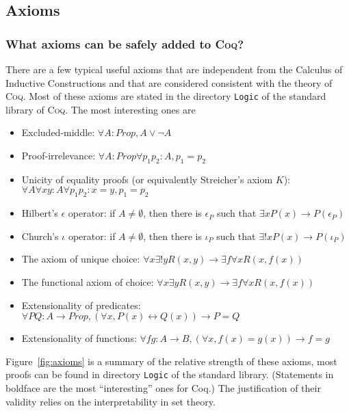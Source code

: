 \documentclass[a4paper,pdftex]{article}
\def\Question#1{\stepcounter{question}\subsubsection{#1}}
\def\Coq{\textsc{Coq}}
\begin{document}
\subsection{Axioms}

\Question{What axioms can be safely added to {\Coq}?}

There are a few typical useful axioms that are independent from the
Calculus of Inductive Constructions and that are considered consistent with
the theory of {\Coq}.
Most of these axioms are stated in the directory {\tt Logic} of the
standard library of {\Coq}. The most interesting ones are

\begin{itemize}
\item Excluded-middle: $\forall A:Prop, A \vee \neg A$
\item Proof-irrelevance: $\forall A:Prop \forall p_1 p_2:A, p_1=p_2$
\item Unicity of equality proofs (or equivalently Streicher's axiom $K$):
$\forall A \forall x y:A \forall p_1 p_2:x=y, p_1=p_2$
\item Hilbert's $\epsilon$ operator: if $A \neq \emptyset$, then there is $\epsilon_P$ such that $\exists x P(x) \rightarrow P(\epsilon_P)$
\item Church's $\iota$ operator: if $A \neq \emptyset$, then there is $\iota_P$ such that $\exists! x P(x) \rightarrow P(\iota_P)$
\item The axiom of unique choice: $\forall x \exists! y R(x,y) \rightarrow \exists f \forall x R(x,f(x))$
\item The functional axiom of choice: $\forall x \exists y R(x,y) \rightarrow \exists f \forall x R(x,f(x))$
\item Extensionality of predicates: $\forall P Q:A\rightarrow Prop, (\forall x, P(x) \leftrightarrow Q(x)) \rightarrow P=Q$
\item Extensionality of functions: $\forall f g:A\rightarrow B, (\forall x, f(x)=g(x)) \rightarrow f=g$
\end{itemize}

Figure~\ref{fig:axioms} is a summary of the relative strength of these
axioms, most proofs can be found in directory {\tt Logic} of the standard
library. (Statements in boldface are the most ``interesting'' ones for
Coq.) The justification of their validity relies on the interpretability
in set theory.

\end{document}
